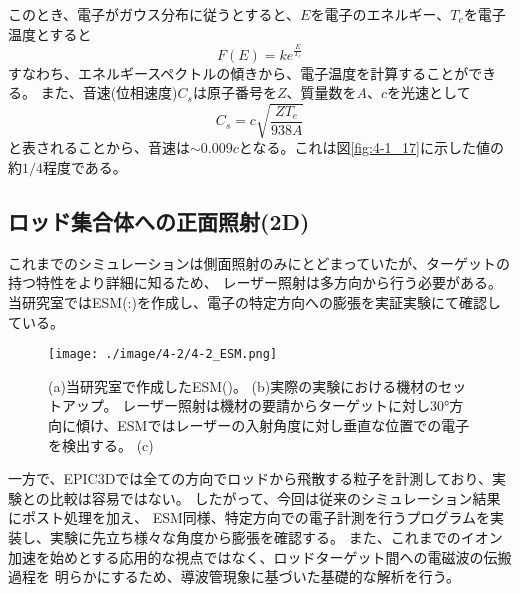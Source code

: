 \documentclass[a4paper,11pt,titlepage]{jsarticle}
\begin{document}
    このとき、電子がガウス分布に従うとすると、$E$を電子のエネルギー、$T_e$を電子温度とすると
    \begin{equation}
      F(E) = k e ^{ \frac{E}{T_e} }
    \end{equation}
    すなわち、エネルギースペクトルの傾きから、電子温度を計算することができる。
    また、音速(位相速度)$C_s$は原子番号を$Z$、質量数を$A$、$c$を光速として
    \begin{equation}
      C_s = c \sqrt{\frac{Z T_e}{938 A}}
    \end{equation}
    と表されることから、音速は$ \sim 0.009c $となる。これは図\ref{fig:4-1_17}に示した値の約$1/4$程度である。


    \subsection{ロッド集合体への正面照射(2D)}
    これまでのシミュレーションは側面照射のみにとどまっていたが、ターゲットの持つ特性をより詳細に知るため、
    レーザー照射は多方向から行う必要がある。当研究室ではESM(:)を作成し、電子の特定方向への膨張を実証実験にて確認している。
    
    \begin{figure}[H]
      \begin{center}
        \texttt{[image: ./image/4-2/4-2\_ESM.png]}
        \label{}
        \caption{
          (a)当研究室で作成したESM()。
          (b)実際の実験における機材のセットアップ。
          レーザー照射は機材の要請からターゲットに対し30°方向に傾け、ESMではレーザーの入射角度に対し垂直な位置での電子を検出する。
          (c)
        }
      \end{center}
    \end{figure}
    一方で、EPIC3Dでは全ての方向でロッドから飛散する粒子を計測しており、実験との比較は容易ではない。
    したがって、今回は従来のシミュレーション結果にポスト処理を加え、
    ESM同様、特定方向での電子計測を行うプログラムを実装し、実験に先立ち様々な角度から膨張を確認する。
    また、これまでのイオン加速を始めとする応用的な視点ではなく、ロッドターゲット間への電磁波の伝搬過程を
    明らかにするため、導波管現象に基づいた基礎的な解析を行う。
\end{document}
